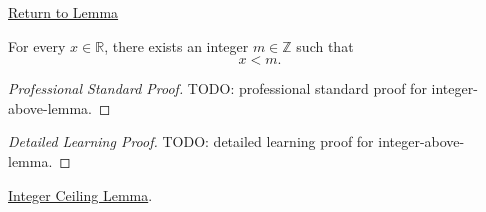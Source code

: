 \newpage
{}
\label{prf:integer-above-lemma}

\begin{remark*}[Return]
\hyperref[lem:integer-above-lemma]{Return to Lemma}
\end{remark*}

\begin{lemma*}
For every $x\in\mathbb{R}$, there exists an integer $m\in\mathbb{Z}$ such
that
\[
x<m.
\]
\end{lemma*}

\begin{proof}[Professional Standard Proof]
\LRAProofBodyStart
TODO: professional standard proof for integer-above-lemma.
\end{proof}

\begin{proof}[Detailed Learning Proof]
\LRAProofBodyStart
TODO: detailed learning proof for integer-above-lemma.
\end{proof}

\begin{remark*}
\end{remark*}

\begin{dependencies}
\hyperref[lem:integer-ceiling-lemma]{Integer Ceiling Lemma}.
\end{dependencies}

\clearpage
